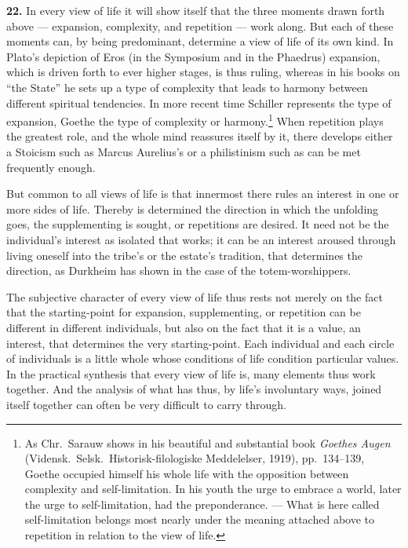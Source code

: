 \documentclass[12pt]{book}
\newcommand{\hnum}[1]{\textbf{#1.}\enspace}
\newcommand{\opage}[1]{\marginnote{\footnotesize\textit{[#1]}}}
\begin{document}
\hnum{22} In every view of life it will show itself that the three moments drawn forth above --- expansion,
complexity, and repetition --- work along. But each of these moments can, by being predominant, determine a view
of life of its own kind. In Plato's depiction of Eros (in the Symposium and in the Phaedrus) expansion, which is
driven forth to ever higher stages, is thus ruling, whereas in his books on ``the State'' he sets up a type of
complexity that leads to harmony between different spiritual tendencies. In more recent time \opage{68}Schiller represents
the type of expansion, Goethe the type of complexity or harmony.\footnote{As Chr.\ Sarauw shows in his beautiful
and substantial book \textit{Goethes Augen} (Vidensk.\ Selsk.\ Historisk-filologiske Meddelelser, 1919), pp.\
134--139, Goethe occupied himself his whole life with the opposition between complexity and self-limitation. In
his youth the urge to embrace a world, later the urge to self-limitation, had the preponderance. --- What is here
called self-limitation belongs most nearly under the meaning attached above to repetition in relation to the view
of life.} When repetition plays the greatest role, and the whole mind reassures itself by it, there develops
either a Stoicism such as Marcus Aurelius's or a philistinism such as can be met frequently enough.

But common to all views of life is that innermost there rules an interest in one or more sides of life. Thereby is
determined the direction in which the unfolding goes, the supplementing is sought, or repetitions are desired. It
need not be the individual's interest as isolated that works; it can be an interest aroused through living oneself
into the tribe's or the estate's tradition, that determines the direction, as Durkheim has shown in the case of
the totem-worshippers.

The subjective character of every view of life thus rests not merely on the fact that the starting-point for
expansion, supplementing, or repetition can be different in different individuals, but also on the fact that it is
a value, an interest, that determines the very starting-point. Each individual and each circle of individuals is a
little whole whose conditions of life condition particular values. In the practical synthesis that every view of
life is, many elements thus work together. And the analysis of what has thus, by life's involuntary ways, joined
itself together can often be very difficult to carry through.
\end{document}

